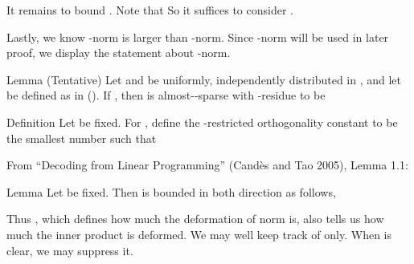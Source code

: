 It remains to bound .
Note that
So it suffices to consider .


Lastly, we know -norm is larger than -norm.
Since -norm will be used in later proof, we display the statement about -norm.

\Result
{Lemma (Tentative)}
{
Let  and  be uniformly, independently distributed in \m {[0,2\pi)}, and let  be defined as in ().
If , then  is almost--sparse with -residue  to be
}

\startsection [title={Concentration Inequality of \m {\M{F}_B, \M{W}_B}}]

\Result
{Definition}
{
Let  be fixed.
For , define the -restricted orthogonality constant  to be the smallest number such that
}

From ``Decoding from Linear Programming'' (Cand\`es and Tao 2005), Lemma 1.1:

\Result
{Lemma}
{
Let  be fixed.
Then  is bounded in both direction as follows,
}

Thus , which defines how much the deformation of norm is, also tells us how much the inner product is deformed.
We may well keep track of  only.
When  is clear, we may suppress it.

